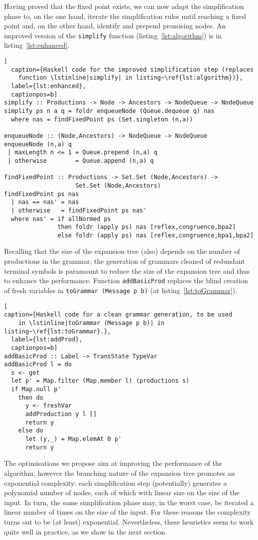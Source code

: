Having proved that the fixed point exists, we can now adapt the
simplification phase to, on the one hand, iterate the simplification
rules until reaching a fixed point and, on the other hand, identify
and prepend promising nodes. An improved version of the
\lstinline|simplify| function (listing~\ref{lst:algorithm}) is in
listing~\ref{lst:enhanced}.

\begin{lstlisting}[
  caption={Haskell code for the improved simplification step (replaces
    function \lstinline|simplify| in listing~\ref{lst:algorithm})},
  label={lst:enhanced},
  captionpos=b]
simplify :: Productions -> Node -> Ancestors -> NodeQueue -> NodeQueue
simplify ps n a q = foldr enqueueNode (Queue.dequeue q) nas
  where nas = findFixedPoint ps (Set.singleton (n,a))

enqueueNode :: (Node,Ancestors) -> NodeQueue -> NodeQueue
enqueueNode (n,a) q
 | maxLength n <= 1 = Queue.prepend (n,a) q
 | otherwise        = Queue.append (n,a) q

findFixedPoint :: Productions -> Set.Set (Node,Ancestors) -> 
                    Set.Set (Node,Ancestors)
findFixedPoint ps nas
  | nas == nas' = nas
  | otherwise   = findFixedPoint ps nas'
  where nas' = if allNormed ps
               then foldr (apply ps) nas [reflex,congruence,bpa2]
               else foldr (apply ps) nas [reflex,congruence,bpa1,bpa2]
\end{lstlisting}

Recalling that the size of the expansion tree (also) depends on the 
number of productions in the grammar, the generation of grammars cleaned
of redundant terminal symbols is paramount to reduce the size of the
expansion tree and thus to enhance the performance. Function
\lstinline|addBasicProd| replaces the blind creation of fresh variables
in \lstinline|toGrammar (Message p b)| (at listing~\ref{lst:toGrammar}).

\begin{lstlisting}[
caption={Haskell code for a clean grammar generation, to be used
    in \lstinline|toGrammar (Message p b)| in listing~\ref{lst:toGrammar}.},
  label={lst:addProd},
  captionpos=b]
addBasicProd :: Label -> TransState TypeVar
addBasicProd l = do
  s <- get
  let p' = Map.filter (Map.member l) (productions s)
  if Map.null p'
    then do
      y <- freshVar
      addProduction y l []
      return y
    else do
      let (y,_) = Map.elemAt 0 p'
      return y
\end{lstlisting}

The optimisations we propose aim at improving the performance of the
algorithm, however the branching nature of the expansion tree promotes
an exponential complexity: each simplification step (potentially)
generates a polynomial number of nodes, each of which with linear size
on the size of the input.  In turn, the same simplification phase may,
in the worst case, be iterated a linear number of times on the size of
the input.  For these reasons the complexity turns out to be (at least)
exponential.  Nevertheless, these heuristics seem to work quite well
in practice, as we show in the next section.

